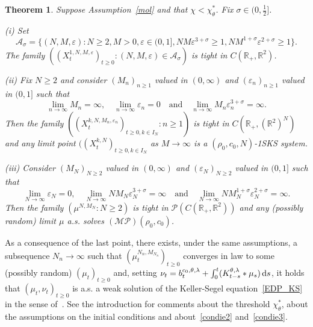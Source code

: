 \documentclass[11pt]{article}
\newtheorem{theorem}{Theorem}
\newcommand{\R}{\mathbb{R}}
\newcommand{\1}{\mathbbm{1}}
\newcommand{\dd}{{\rm d}}
\newcommand{\Aa}{\mathcal A}
\newcommand{\Pp}{\mathcal P}
\newcommand{\e}{\varepsilon}
\newcommand{\vip}{\vskip5pt}
\begin{document}
\begin{theorem}\label{main}
Suppose Assumption~\ref{mol} and that $\chi<\chi^*_\theta$. Fix $\sigma\in (0,\frac 12]$.

\vip

(i) Set
\begin{equation}\label{condie1}
\Aa_\sigma=\{(N,M,\e) : N\geq 2, M>0, \e\in (0,1], N M\e^{3+\sigma}\geq 1, N M^{1+\sigma} \e^{2+\sigma} \geq 1\}.
\end{equation}
The family 
$((X^{1,N,M,\e}_t)_{t\geq 0} : (N,M,\e)\in \Aa_\sigma)$ is tight in $C(\R_+,\R^2)$.

\vip

(ii) Fix $N\geq 2$ and consider $(M_n)_{n\geq 1}$ valued in $(0,\infty)$ and $(\e_n)_{n\geq1}$ valued in 
$(0,1]$ such that 
\begin{equation}\label{condie2}
\lim_{n\to \infty} M_n= \infty, \quad \lim_{n\to \infty} \e_n=0 \quad \text{and} \quad \lim_{n\to\infty}
M_n\e_n^{3+\sigma}=\infty.
\end{equation}
Then the family $((X^{k,N,M_n,\e_n}_t)_{t\geq 0, k \in I_N} : n\geq 1)$ is tight in $C(\R_+,(\R^2)^N)$
and any limit point $((X^{k,N}_t)_{t\geq 0, k \in I_N}$ as $M\to \infty$ is a $(\rho_0,c_0,N)$-1SKS system.

\vip

(iii) Consider  $(M_N)_{N\geq 2}$ valued in $(0,\infty)$ and $(\e_N)_{N\geq2}$ valued in $(0,1]$ such that 
\begin{equation}\label{condie3}
\lim_{N\to \infty} \e_{N}=0, \quad \lim_{N\to \infty}  N M_N\e_N^{3+\sigma}=\infty\quad \text{and} 
\quad \lim_{N\to \infty} N M_N^{1+\sigma}\e_N^{2+\sigma}=\infty.
\end{equation}
Then the family $(\mu^{N,{M_N}} : N \geq 2)$ is tight in $\Pp(C(\R_+,\R^2))$ and any (possibly random) 
limit $\mu$ a.s. solves $\mathcal{(MP)}(\rho_0,c_0)$.
\end{theorem} 

As a consequence of the last point, there exists, under the same assumptions, a subsequence $N_n\to \infty$ 
such that $(\mu^{N_n,{M_{N_n}}}_t)_{t\geq 0}$ converges in law to some (possibly random)
$(\mu_t)_{t\geq 0}$ and, setting $\nu_t=b_t^{c_0,\theta,\lambda}+ \int_0^t (K^{\theta,\lambda}_{t-s} \ast \mu_s )\,\dd s$, it holds that $(\mu_t,\nu_t)_{t\geq 0}$ is a.s. a weak solution of the Keller-Segel equation~\eqref{EDP_KS} in the sense of~\cite[Definition~1]{FT1}.
See the introduction for comments about the threshold $\chi^*_\theta$, about the assumptions on the initial conditions and about~\eqref{condie2} and~\eqref{condie3}. 
\end{document}
